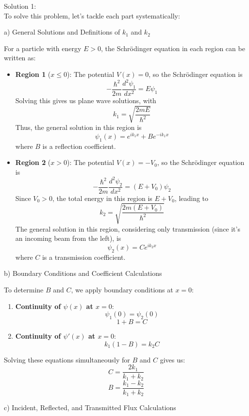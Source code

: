 \documentclass[a4paper,11pt]{article}
\begin{document}
\bigskip

\noindent Solution 1: \\

To solve this problem, let's tackle each part systematically:

a) General Solutions and Definitions of \(k_1\) and \(k_2\)

For a particle with energy \(E > 0\), the Schrödinger equation in each region can be written as:

\begin{itemize}
    \item \textbf{Region 1} (\(x \leq 0\)): The potential \(V(x) = 0\), so the Schrödinger equation is
    \[ -\frac{\hbar^2}{2m} \frac{d^2\psi_1}{dx^2} = E\psi_1 \]
    Solving this gives us plane wave solutions, with
    \[ k_1 = \sqrt{\frac{2mE}{\hbar^2}} \]
    Thus, the general solution in this region is
    \[ \psi_1(x) = e^{ik_1x} + Be^{-ik_1x} \]
    where \(B\) is a reflection coefficient.

    \item \textbf{Region 2} (\(x > 0\)): The potential \(V(x) = -V_0\), so the Schrödinger equation is
    \[ -\frac{\hbar^2}{2m} \frac{d^2\psi_2}{dx^2} = (E + V_0)\psi_2 \]
    Since \(V_0 > 0\), the total energy in this region is \(E + V_0\), leading to
    \[ k_2 = \sqrt{\frac{2m(E + V_0)}{\hbar^2}} \]
    The general solution in this region, considering only transmission (since it's an incoming beam from the left), is
    \[ \psi_2(x) = Ce^{ik_2x} \]
    where \(C\) is a transmission coefficient.
\end{itemize}

b) Boundary Conditions and Coefficient Calculations

To determine \(B\) and \(C\), we apply boundary conditions at \(x = 0\):

\begin{enumerate}
    \item \textbf{Continuity of \(\psi(x)\) at \(x = 0\)}:
    \[ \psi_1(0) = \psi_2(0) \]
    \[ 1 + B = C \]

    \item \textbf{Continuity of \(\psi'(x)\) at \(x = 0\)}:
    \[ k_1(1 - B) = k_2C \]
\end{enumerate}

Solving these equations simultaneously for \(B\) and \(C\) gives us:
\[ C = \frac{2k_1}{k_1 + k_2} \]
\[ B = \frac{k_1 - k_2}{k_1 + k_2} \]

c) Incident, Reflected, and Transmitted Flux Calculations
\end{document}
